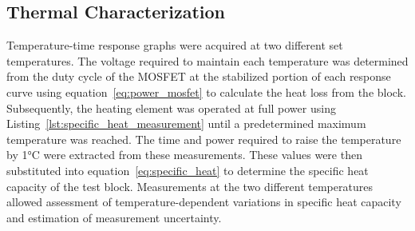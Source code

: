 \subsection{Thermal Characterization}
\label{subsec:thermal-characterization}

Temperature-time response graphs were acquired at two different set
temperatures.
The voltage required to maintain each temperature was determined from the duty
cycle of the MOSFET at the stabilized portion of each response curve using
equation~\ref{eq:power_mosfet} to calculate the heat loss from the block.
Subsequently, the heating element was operated at full power using
Listing~\ref{lst:specific_heat_measurement} until a predetermined maximum
temperature was reached.
The time and power required to raise the temperature by 1°C were extracted
from these measurements.
These values were then substituted into equation~\ref{eq:specific_heat} to
determine the specific heat capacity of the test block.
Measurements at the two different temperatures allowed assessment of
temperature-dependent variations in specific heat capacity and estimation of
measurement uncertainty.